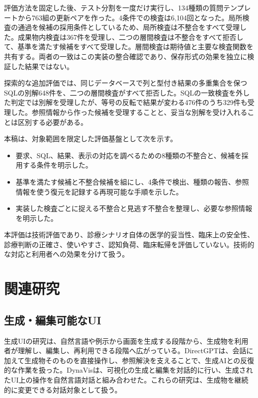 \documentclass[manuscript,review,anonymous]{acmart}
\begin{document}
評価方法を固定した後、テスト分割を一度だけ実行し、134種類の質問テンプレートから763組の更新ペアを作った。4条件での検査は6,104回となった。局所検査の通過を候補の採用条件としているため、局所検査は不整合をすべて受理した。成果物内検査は367件を受理し、二つの層間検査は不整合をすべて拒否して、基準を満たす候補をすべて受理した。層間検査は期待値と主要な検査関数を共有する。両者の一致はこの実装の整合確認であり、保存形式の効果を独立に検証した結果ではない。

探索的な追加評価では、同じデータベースで列と型付き結果の多重集合を保つSQLの別解648件を、二つの層間検査がすべて拒否した。SQLの一致検査を外した判定では別解を受理したが、等号の反転で結果が変わる476件のうち329件も受理した。参照情報から作った候補を受理することと、妥当な別解を受け入れることは区別する必要がある。

本稿は、対象範囲を限定した評価基盤として次を示す。

\begin{itemize}
  \item 要求、SQL、結果、表示の対応を調べるための8種類の不整合と、候補を採用する条件を明示した。
  \item 基準を満たす候補と不整合候補を組にし、4条件で検出、種類の報告、参照情報を使う復元を記録する再現可能な手順を示した。
  \item 実装した検査ごとに捉える不整合と見逃す不整合を整理し、必要な参照情報を明示した。
\end{itemize}

本評価は技術評価であり、診療シナリオ自体の医学的妥当性、臨床上の安全性、診療判断の正確さ、使いやすさ、認知負荷、臨床転帰を評価していない。技術的な対応と利用者への効果を分けて扱う。

\section{関連研究}

\subsection{生成・編集可能なUI}

生成UIの研究は、自然言語や例示から画面を生成する段階から、生成物を利用者が理解し、編集し、再利用できる段階へ広がっている。DirectGPTは、会話に加えて生成物そのものを直接操作し、参照解決を支えることで、生成AIとの反復的な作業を扱った\cite{masson2024directgpt}。DynaVisは、可視化の生成と編集を対話的に行い、生成されたUI上の操作を自然言語対話と組み合わせた\cite{vaithilingam2024dynavis}。これらの研究は、生成物を継続的に変更できる対話対象として扱う。
\end{document}
